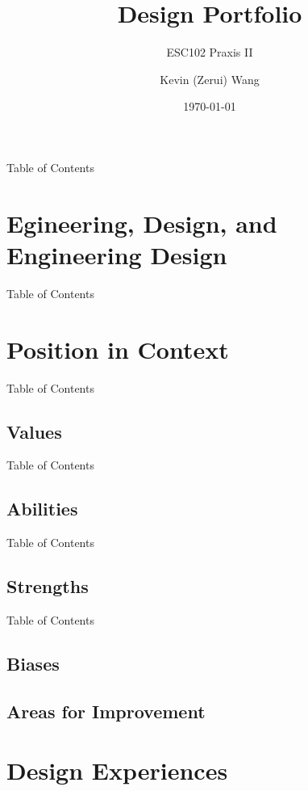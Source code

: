 \documentclass[aspectratio=1610]{beamer}
\title[Student Engineer Design Portfolio]{Design Portfolio}
\subtitle{ESC102 Praxis II}
\author[Page \insertframenumber]{Kevin (Zerui) Wang}
\institute{University of Toronto}
\date{\today}
\begin{document}
{
\begin{frame}
\titlepage
\end{frame}
}
\addtocounter{framenumber}{-1}

{
\begin{frame}{Table of Contents}
    \tableofcontents
\end{frame}
}

\section{Egineering, Design, and Engineering Design}

\begin{frame}{Table of Contents}
\end{frame}
\section{Position in Context}
\begin{frame}{Table of Contents}
\end{frame}
\subsection{Values}
\begin{frame}{Table of Contents}
\end{frame}
\subsection{Abilities}
\begin{frame}{Table of Contents}
\end{frame}
\subsection{Strengths}
\begin{frame}{Table of Contents}
\end{frame}
\subsection{Biases}
\subsection{Areas for Improvement}
\section{Design Experiences}
\end{document}
